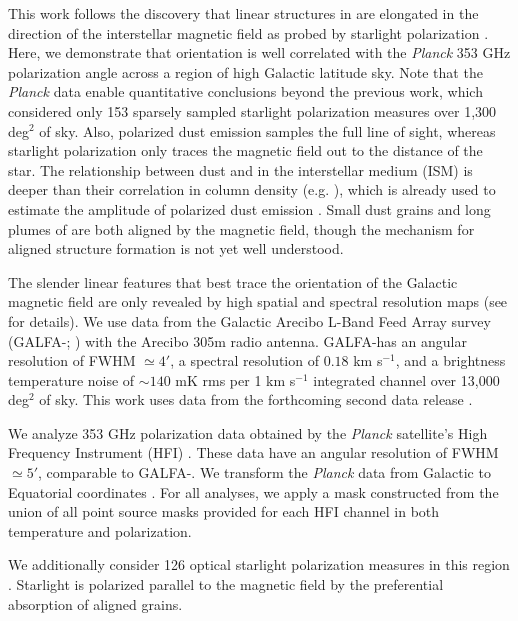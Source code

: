 This work follows the discovery that linear structures in \hi are elongated in the direction of the interstellar magnetic field as probed by starlight polarization \cite{Clark:2014it}. Here, we demonstrate that \hi orientation is well correlated with the \textit{Planck} 353 GHz polarization angle across a region of high Galactic latitude sky. 
Note that the \textit{Planck} data enable quantitative conclusions beyond the previous work, which considered only 153 sparsely sampled starlight polarization measures over 1,300 deg$^2$ of sky. Also, polarized dust emission samples the full line of sight, whereas starlight polarization only traces the magnetic field out to the distance of the star. The relationship between dust and \hi in the interstellar medium (ISM) is deeper than their correlation in column density (e.g. \cite{Burstein:1982wb}), which is already used to estimate the amplitude of polarized dust emission \cite{Flauger:2014ub, Collaboration:2014wt}. Small dust grains and long plumes of \hi are both aligned by the magnetic field, though the mechanism for aligned \hi structure formation is not yet well understood.

The slender linear features that best trace the orientation of the Galactic magnetic field are only revealed by high spatial and spectral resolution \hi maps (see \cite{Clark:2014it} for details). We use data from the Galactic Arecibo L-Band Feed Array \hi survey (GALFA-\HI; \cite{Peek:2011fp}) with the Arecibo 305m radio antenna. GALFA-\hi has an angular resolution of FWHM $\simeq 4'$, a spectral resolution of $0.18$ km s$^{-1}$, and a brightness temperature noise of $\sim 140$ mK rms per 1 km s$^{-1}$ integrated channel over 13,000 deg$^2$ of sky. This work uses data from the forthcoming second data release \cite{Peek:2015}.

We analyze 353 GHz polarization data obtained by the \textit{Planck} satellite's High Frequency Instrument (HFI) \cite{Collaboration:2014wt}. These data have an angular resolution of FWHM $\simeq 5'$, comparable to GALFA-\HI. We transform the \textit{Planck} data from Galactic to Equatorial coordinates \cite{Healpix:footnote}. For all analyses, we apply a mask constructed from the union of all point source masks provided for each HFI channel in both temperature and polarization.

We additionally consider 126 optical starlight polarization measures in this region \cite{Heiles:2000un}. Starlight is polarized parallel to the magnetic field by the preferential absorption of aligned grains.

